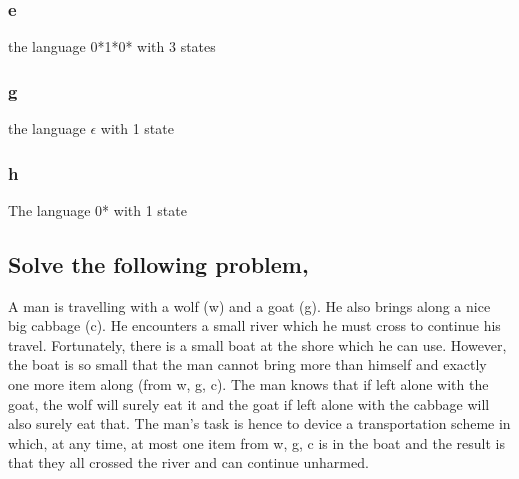 \documentclass[a4paper,10pt,titlepage]{report}
\begin{document}
\subsubsection{e}
the language 0*1*0* with 3 states \\
\subsubsection{g}
the language {$\epsilon$} with 1 state \\



\subsubsection{h}
The language 0* with 1 state \\



\subsection{Solve the following problem,}

A man is travelling with a wolf (w) and a goat (g). He also brings along a nice big
cabbage (c). He encounters a small river which he must cross to continue his travel.
Fortunately, there is a small boat at the shore which he can use. However, the boat
is so small that the man cannot bring more than himself and exactly one more item
along (from {w, g, c}). The man knows that if left alone with the goat, the wolf will
surely eat it and the goat if left alone with the cabbage will also surely eat that. The
man’s task is hence to device a transportation scheme in which, at any time, at most
one item from {w, g, c} is in the boat and the result is that they all crossed the river
and can continue unharmed.
\end{document}
